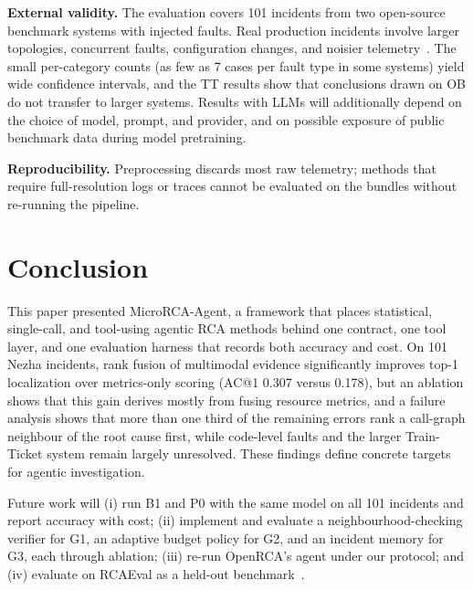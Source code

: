 \documentclass[conference]{IEEEtran}
\begin{document}
\textbf{External validity.} The evaluation covers 101 incidents from two open-source benchmark systems with injected faults. Real production incidents involve larger topologies, concurrent faults, configuration changes, and noisier telemetry~\cite{zhou2021trainticket,soldani2022survey}. The small per-category counts (as few as 7 cases per fault type in some systems) yield wide confidence intervals, and the TT results show that conclusions drawn on OB do not transfer to larger systems. Results with LLMs will additionally depend on the choice of model, prompt, and provider, and on possible exposure of public benchmark data during model pretraining.

\textbf{Reproducibility.} Preprocessing discards most raw telemetry; methods that require full-resolution logs or traces cannot be evaluated on the bundles without re-running the pipeline.

\section{Conclusion}

This paper presented MicroRCA-Agent, a framework that places statistical, single-call, and tool-using agentic RCA methods behind one contract, one tool layer, and one evaluation harness that records both accuracy and cost. On 101 Nezha incidents, rank fusion of multimodal evidence significantly improves top-1 localization over metrics-only scoring (AC@1 0.307 versus 0.178), but an ablation shows that this gain derives mostly from fusing resource metrics, and a failure analysis shows that more than one third of the remaining errors rank a call-graph neighbour of the root cause first, while code-level faults and the larger Train-Ticket system remain largely unresolved. These findings define concrete targets for agentic investigation.

Future work will (i) run B1 and P0 with the same model on all 101 incidents and report accuracy with cost; (ii) implement and evaluate a neighbourhood-checking verifier for G1, an adaptive budget policy for G2, and an incident memory for G3, each through ablation; (iii) re-run OpenRCA's agent under our protocol; and (iv) evaluate on RCAEval as a held-out benchmark~\cite{pham2025rcaeval}.



\end{document}
